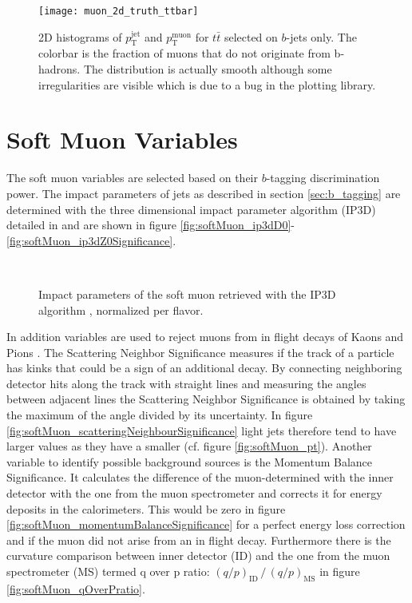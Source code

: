 \begin{figure}[]
  \texttt{[image: muon\_2d\_truth\_ttbar]}
  \caption{2D histograms of $p_\mathrm{T}^\mathrm{jet}$ and $p_\mathrm{T}^\mathrm{muon}$ for $t\bar{t}$ selected on $b$-jets only. The colorbar is the fraction of muons that do not originate from b-hadrons. The distribution is actually smooth although some irregularities are visible which is due to a bug in the plotting library.}
  \label{fig:muon_2d_truth}
\end{figure}



\section{Soft Muon Variables}
\label{sec:SoftMuonVariables}
The soft muon variables are selected based on their $b$-tagging discrimination power. The impact parameters of jets as described in section \ref{sec:b_tagging} are determined with the three dimensional impact parameter algorithm (IP3D) detailed in \citep{ATL-PHYS-PUB-2017-013} and are shown in figure \ref{fig:softMuon_ip3dD0}-\ref{fig:softMuon_ip3dZ0Significance}.
\begin{figure}[]
  \centering
  \\
  \caption{Impact parameters of the soft muon retrieved with the IP3D algorithm \citep{ATL-PHYS-PUB-2017-013}, normalized per flavor.}
  \label{fig:softMuonKinematics}
\end{figure}
In addition variables are used to reject muons from in flight decays of Kaons and Pions \citep{ATLAS-CONF-2020-030}. The Scattering Neighbor Significance measures if the track of a particle has kinks that could be a sign of an additional decay. By connecting neighboring detector hits along the track with straight lines and measuring the angles between adjacent lines the Scattering Neighbor Significance is obtained by taking the maximum of the angle divided by its uncertainty. In figure \ref{fig:softMuon_scatteringNeighbourSignificance} light jets therefore tend to have larger values as they have a smaller \pt (cf. figure \ref{fig:softMuon_pt}). Another variable to identify possible background sources is the Momentum Balance Significance. It calculates the difference of the muon-\pt determined with the inner detector with the one from the muon spectrometer and corrects it for energy deposits in the calorimeters. This would be zero in figure \ref{fig:softMuon_momentumBalanceSignificance} for a perfect energy loss correction and if the muon did not arise from an in flight decay. Furthermore there is the curvature comparison between inner detector (ID) and the one from the muon spectrometer (MS) termed q over p ratio: $(q/p)_\mathrm{ID}\, \bm{/}\, (q/p)_\mathrm{MS}$ in figure \ref{fig:softMuon_qOverPratio}.

